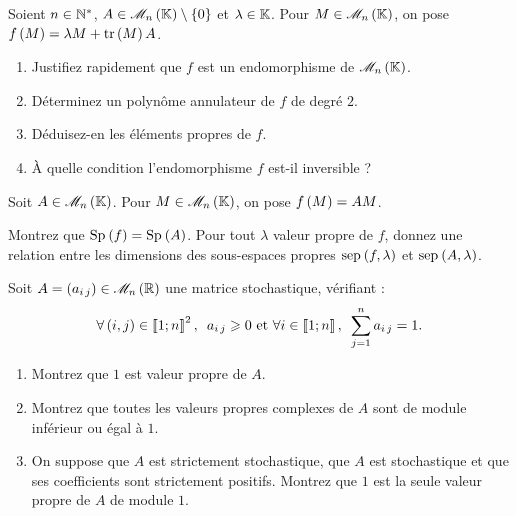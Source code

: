 \begin{exoss}[Exercice 3]
Soient \(n\in\mathbb{N}^*\), \(A\in\M{n}\excluant\accol{0}\) et \(\lambda\in\mathbb{K}\). Pour \(M\in\M{n}\), on pose \(f\left(M\right)=\lambda M+\operatorname{tr}\left(M\right)A\).

\begin{enumerate}
    \item Justifiez rapidement que \(f\) est un endomorphisme de \(\M{n}\). \\
    \item Déterminez un polynôme annulateur de \(f\) de degré \(2\). \\
    \item Déduisez-en les éléments propres de \(f\). \\
    \item À quelle condition l'endomorphisme \(f\) est-il inversible ?
\end{enumerate}
\end{exoss}



\begin{exoss}[Exercice 4]
Soit \(A\in\M{n}\). Pour \(M\in\M{n}\), on pose \(f\left(M\right)=AM\).

Montrez que \(\Sp{f}=\Sp{A}\). Pour tout \(\lambda\) valeur propre de \(f\), donnez une relation entre les dimensions des sous-espaces propres \(\sep{f}{\lambda}\) et \(\sep{A}{\lambda}\).
\end{exoss}



\begin{exoss}
Soit \(A=\paren{a_{i\,j}}\in\M{n}[\R]\) une matrice stochastique, \cad vérifiant : \[\quantifs{\forall\paren{i,j}\in\interventierii{1}{n}^2}a_{i\,j}\geq0\text{ et }\quantifs{\forall i\in\interventierii{1}{n}}\sum_{j=1}^na_{i\,j}=1.\]

\begin{enumerate}
    \item Montrez que \(1\) est valeur propre de \(A\). \\
    \item Montrez que toutes les valeurs propres complexes de \(A\) sont de module inférieur ou égal à \(1\). \\
    \item On suppose que \(A\) est strictement stochastique, \cad que \(A\) est stochastique et que ses coefficients sont strictement positifs. Montrez que \(1\) est la seule valeur propre de \(A\) de module \(1\).
\end{enumerate}
\end{exoss}



